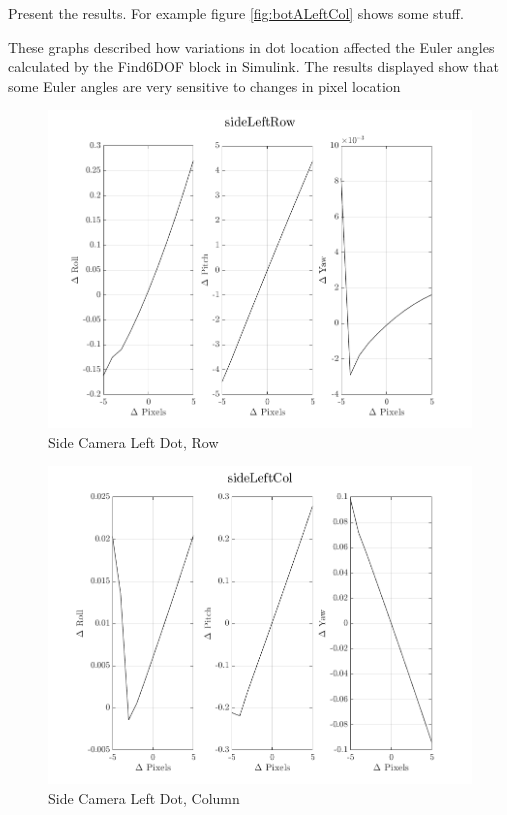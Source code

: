 \documentclass[12pt]{article}
\begin{document}
\begin{multicols}{2}
Present the results. For example figure \ref{fig:botALeftCol} shows some stuff.

These graphs described how variations in dot location affected the Euler angles calculated by the Find6DOF block in Simulink. The results displayed show that some Euler angles are very sensitive to changes in pixel location 


\begin{figure}[H]
	\includegraphics[width=0.9\columnwidth]{sideLeftRow.png}
	\caption{Side Camera Left Dot, Row\label{fig:sideLeftRow}}
\end{figure}

\begin{figure}[H]
	\includegraphics[width=0.9\columnwidth]{sideLeftCol.png}
	\caption{Side Camera Left Dot, Column\label{fig:sideLeftCol}}
\end{figure}


\end{multicols}
\end{document}
